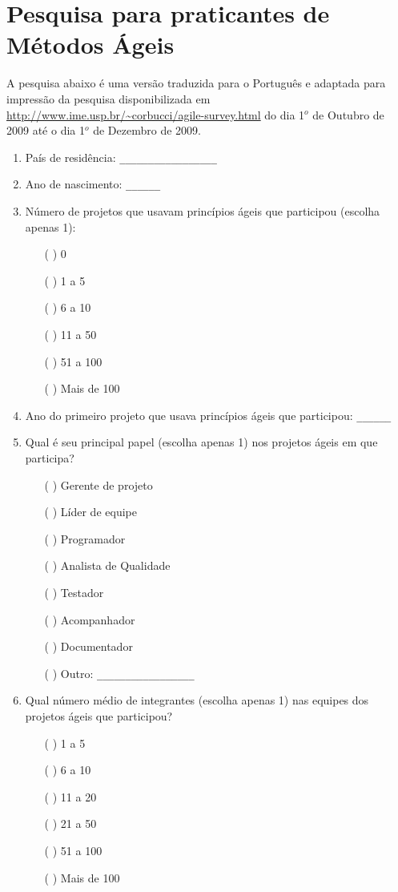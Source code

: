 \chapter{Pesquisa para praticantes de Métodos Ágeis}
\label{ape:MA}

\singlespacing

A pesquisa abaixo é uma versão traduzida para o Português e adaptada
para impressão da pesquisa disponibilizada em
\url{http://www.ime.usp.br/~corbucci/agile-survey.html} do dia 1$^o$
de Outubro de 2009 até o dia 1$^o$ de Dezembro de 2009.

\begin{enumerate}
\item País de residência: \verb=_________________=

\item Ano de nascimento: \verb=______=

\item Número de projetos que usavam princípios ágeis que participou
  (escolha apenas 1):
  \begin{itemize}
  \item[( )] 0
  \item[( )] 1 a 5
  \item[( )] 6 a 10
  \item[( )] 11 a 50
  \item[( )] 51 a 100
  \item[( )] Mais de 100
  \end{itemize}

\item Ano do primeiro projeto que usava princípios ágeis que
  participou: \verb=______=

\item Qual é seu principal papel (escolha apenas 1) nos projetos ágeis
  em que participa?
  \begin{itemize}
  \item[( )] Gerente de projeto
  \item[( )] Líder de equipe
  \item[( )] Programador
  \item[( )] Analista de Qualidade
  \item[( )] Testador
  \item[( )] Acompanhador
  \item[( )] Documentador
  \item[( )] Outro: \verb=_________________=
  \end{itemize}

\item Qual número médio de integrantes (escolha apenas 1) nas equipes
  dos projetos ágeis que participou?
  \begin{itemize}
  \item[( )] 1 a 5
  \item[( )] 6 a 10
  \item[( )] 11 a 20
  \item[( )] 21 a 50
  \item[( )] 51 a 100
  \item[( )] Mais de 100
  \end{itemize}


\end{enumerate}
